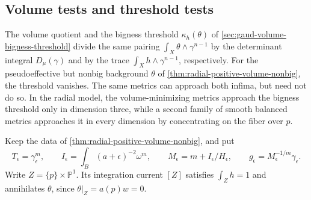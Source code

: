 \subsection{Volume tests and threshold tests}
\label{sec:radial-gauduchon-test-limits}

The volume quotient and the bigness threshold $\kappa_h(\theta)$ of \cref{sec:gaud-volume-bigness-threshold} divide the same pairing $\int_X\theta\wedge\gamma^{n-1}$ by the determinant integral $D_\mu(\gamma)$ and by the trace $\int_Xh\wedge\gamma^{n-1}$, respectively. For the pseudoeffective but nonbig background $\theta$ of \cref{thm:radial-positive-volume-nonbig}, the threshold vanishes. The same metrics can approach both infima, but need not do so. In the radial model, the volume-minimizing metrics approach the bigness threshold only in dimension three, while a second family of smooth balanced metrics approaches it in every dimension by concentrating on the fiber over $p$.

Keep the data of \cref{thm:radial-positive-volume-nonbig}, and put
\[
 T_\epsilon=\gamma_\epsilon^m,\qquad
 I_\epsilon=\int_B(a+\epsilon)^{-2}\omega^m,
 \qquad M_\epsilon=m+I_\epsilon/H_\epsilon,
 \qquad g_\epsilon=M_\epsilon^{-1/m}\gamma_\epsilon.
\]
Write $Z=\{p\}\times\mathbb P^1$. Its integration current $[Z]$ satisfies $\int_Zh=1$ and annihilates $\theta$, since $\theta|_Z=a(p)w=0$.

